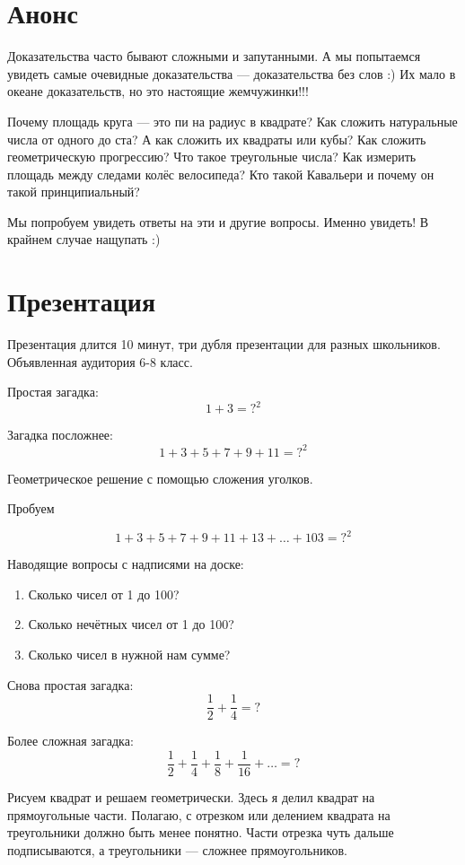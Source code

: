 \documentclass[a4paper, 12pt]{article}
\begin{document}
\section{Анонс}

Доказательства часто бывают сложными и запутанными. А мы попытаемся увидеть самые очевидные доказательства — доказательства без слов :) Их мало в океане доказательств, но это настоящие жемчужинки!!! 

Почему площадь круга — это пи на радиус в квадрате? Как сложить натуральные числа от одного до ста? А как сложить их квадраты или кубы? Как сложить геометрическую прогрессию? Что такое треугольные числа? Как измерить площадь между следами колёс велосипеда? Кто такой Кавальери и почему он такой принципиальный? 

Мы попробуем увидеть ответы на эти и другие вопросы. Именно увидеть! В крайнем случае нащупать :)


\section{Презентация}

Презентация длится 10 минут, три дубля презентации для разных школьников. 
Объявленная аудитория 6-8 класс.

Простая загадка:
\[
   1 + 3 = ?^2
\]

Загадка посложнее:
\[
 1 + 3 + 5 + 7 + 9 + 11 = ?^2
\]

Геометрическое решение с помощью сложения уголков.

Пробуем 

\[
 1 + 3 + 5 + 7 + 9 + 11 + 13 + \ldots + 103 = ?^2
\]

Наводящие вопросы с надписями на доске:
\begin{enumerate}
  \item Сколько чисел от 1 до 100?
  \item Сколько нечётных чисел от 1 до 100?
  \item Сколько чисел в нужной нам сумме?
\end{enumerate}


Снова простая загадка:
\[
  \frac{1}{2} + \frac{1}{4} = ?
\]


Более сложная загадка:
\[
  \frac{1}{2} + \frac{1}{4} + \frac{1}{8} + \frac{1}{16} + \ldots = ?
\]


Рисуем квадрат и решаем геометрически. 
Здесь я делил квадрат на прямоугольные части. 
Полагаю, с отрезком или делением квадрата на треугольники должно быть менее понятно. 
Части отрезка чуть дальше подписываются,
а треугольники — сложнее прямоугольников.
\end{document}
